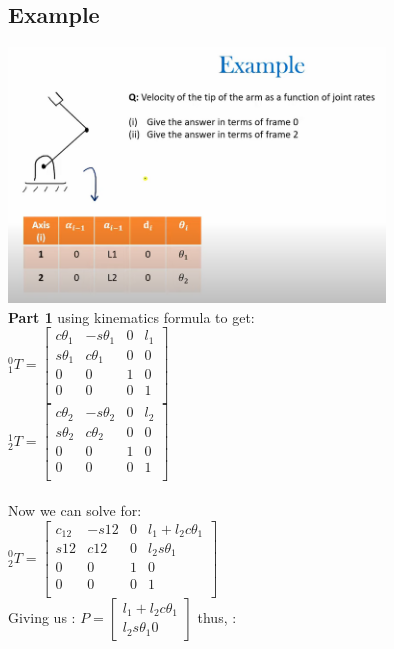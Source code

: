 \documentclass{article}
\begin{document}
\subsection{Example}
\includegraphics[width=10cm]{partial_diferentiation_example.png}\\
\textbf{Part 1} using kinematics formula to get:\\
${}^0_1T=\begin{bmatrix}
c\theta_1 & -s\theta_1 & 0 & l_1 \\
s\theta_1 & c\theta_1 & 0 & 0 \\
0 & 0 & 1 & 0 \\
0 & 0 & 0 & 1 \\
\end{bmatrix}$\\
${}^1_2T=\begin{bmatrix}
c\theta_2 & -s\theta_2 & 0 & l_2 \\
s\theta_2 & c\theta_2 & 0 & 0 \\
0 & 0 & 1 & 0 \\
0 & 0 & 0 & 1 \\
\end{bmatrix}$\\\\
Now we can solve for:\\
${}^0_2T=\begin{bmatrix}
c_{12} & -s{12} & 0 & l_1 + l_2 c\theta_1\\
s{12} & c{12} & 0 & l_2 s\theta_1 \\
0 & 0 & 1 & 0 \\
0 & 0 & 0 & 1 \\
\end{bmatrix}$\\
Giving us : $P=\begin{bmatrix}
              l_1 + l_2 c\theta_1\\
              l_2 s\theta_1
              0
\end{bmatrix}$ thus, :
\end{document}
